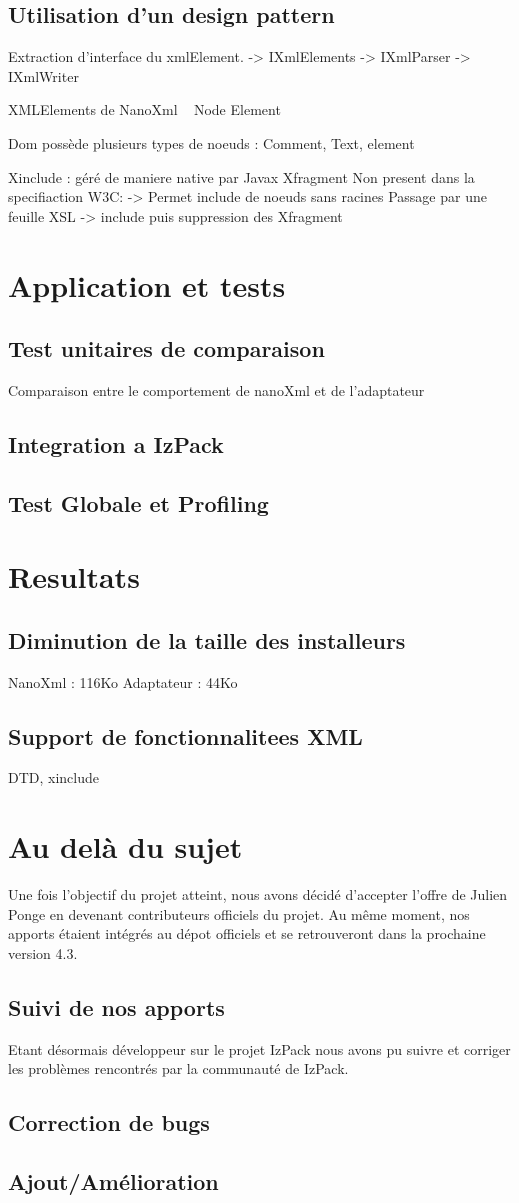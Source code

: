 \subsection{Utilisation d'un design pattern}
Extraction d'interface du xmlElement.
-> IXmlElements
-> IXmlParser
-> IXmlWriter

XMLElements de NanoXml ~ Node Element

Dom possède plusieurs types de noeuds : Comment, Text, element

Xinclude : géré de maniere native par Javax
Xfragment Non present dans la specifiaction W3C:
-> Permet include de noeuds sans racines
Passage par une feuille XSL
-> include puis suppression des Xfragment
\section{Application et tests}
\subsection{Test unitaires de comparaison}
Comparaison entre le comportement de nanoXml et de l'adaptateur
\subsection{Integration a IzPack}
\subsection{Test Globale et Profiling}

\section{Resultats}
\subsection{Diminution de la taille des installeurs}
NanoXml : 116Ko
Adaptateur : 44Ko
\subsection{Support de fonctionnalitees XML}
DTD, xinclude

\section{Au delà du sujet}
Une fois l'objectif du projet atteint, nous avons décidé d'accepter l'offre de Julien Ponge en devenant contributeurs officiels du projet. Au même moment, nos apports étaient intégrés au dépot officiels et se retrouveront dans la prochaine version 4.3.

\subsection{Suivi de nos apports}
Etant désormais développeur sur le projet IzPack nous avons pu suivre et corriger les problèmes rencontrés par la communauté de IzPack.

\subsection{Correction de bugs}

\subsection{Ajout/Amélioration}